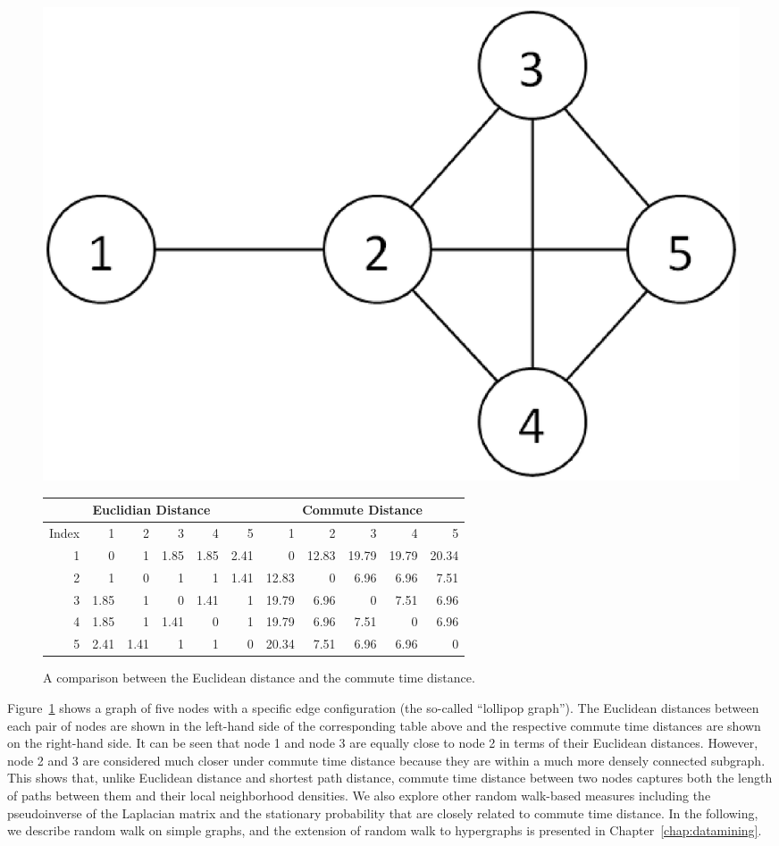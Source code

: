 \begin{figure}[tbh]
\centering
\begin{minipage}[c]{\textwidth}\centering
\includegraphics[width=.4\textwidth]{fig/comm-dist-demo.eps}
\end{minipage}
\hfill
\begin{minipage}[c]{\textwidth}\centering
\begin{tabular}{r|r|r|r|r|r || r|r|r|r|r}
\hline\hline
\multicolumn{6}{c||}{Euclidian Distance}	&	\multicolumn{5}{c}{Commute Distance}		\\
\hline\hline							
Index	&	1	&	2	&	3	&	4	&	5	&	1	&	2	&	3	&	4	&	5	\\
\hline
1	&	0	&	1	&	1.85	&	1.85	&	2.41	&	0	&	12.83	&	19.79	&	19.79	&	20.34	\\
\hline
2	&	1	&	0	&	1	&	1	&	1.41	&	12.83	&	0	&	6.96	&	6.96	&	7.51	\\
\hline
3	&	1.85	&	1	&	0	&	1.41	&	1	&	19.79	&	6.96	&	0	&	7.51	&	6.96	\\
\hline
4	&	1.85	&	1	&	1.41	&	0	&	1	&	19.79	&	6.96	&	7.51	&	0	&	6.96	\\
\hline
5	&	2.41	&	1.41	&	1	&	1	&	0	&	20.34	&	7.51	&	6.96	&	6.96	&	0	\\
\hline\hline
\end{tabular}
\end{minipage}
\caption{\label{fig:cd-demo} A comparison between the Euclidean distance and the commute time distance.}
\end{figure}

Figure~\ref{fig:cd-demo} shows a graph of five nodes with a specific edge configuration (the so-called ``lollipop graph''). The Euclidean distances between each pair of nodes are shown in the left-hand side of the corresponding table above and the respective commute time distances are shown on the right-hand side. It can be seen that node 1 and node 3 are equally close to node 2 in terms of their Euclidean distances. However, node 2 and 3 are considered much closer under commute time distance because they are within a much more densely connected subgraph. This shows that, unlike Euclidean distance and shortest path distance, commute time distance between two nodes captures both the length of paths between them and their local neighborhood densities. We also explore other random walk-based measures including the pseudoinverse of the Laplacian matrix and the stationary probability that are closely related to commute time distance. In the following, we describe random walk on simple graphs, and the extension of random walk to hypergraphs is presented in Chapter~\ref{chap:datamining}. %


